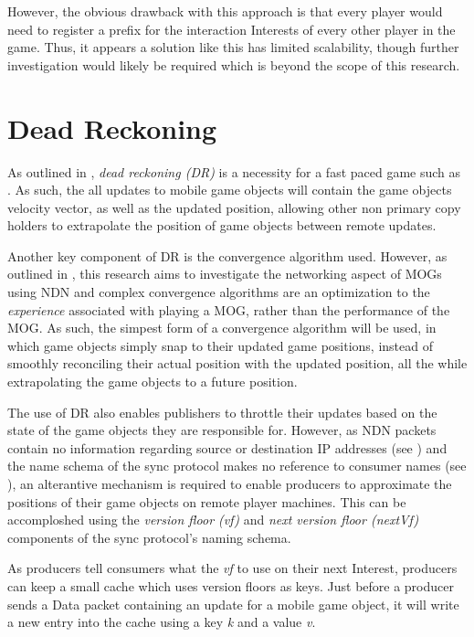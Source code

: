 However, the obvious drawback with this approach is that every player would need to register a prefix for the interaction Interests of every other player in the game. Thus, it appears a solution like this has limited scalability, though further investigation would likely be required which is beyond the scope of this research. 



\section{Dead Reckoning}\label{sec:des:dr}
As outlined in , \textit{dead reckoning (DR)} is a necessity for a fast paced game such as \game{}. As such, the all updates to mobile game objects will contain the game objects velocity vector, as well as the updated position, allowing other non primary copy holders to extrapolate the position of game objects between remote updates.

Another key component of DR is the convergence algorithm used. However, as outlined in , this research aims to investigate the networking aspect of MOGs using NDN and complex convergence algorithms are an optimization to the \textit{experience} associated with playing a MOG, rather than the performance of the MOG. As such, the simpest form of a convergence algorithm will be used, in which game objects simply snap to their updated game positions, instead of smoothly reconciling their actual position with the updated position, all the while extrapolating the game objects to a future position.

The use of DR also enables publishers to throttle their updates based on the state of the game objects they are responsible for. However, as NDN packets contain no information regarding source or destination IP addresses (see ) and the name schema of the sync protocol makes no reference to consumer names (see ), an alterantive mechanism is required to enable producers to approximate the positions of their game objects on remote player machines. This can be accomploshed using the \textit{version floor (vf)} and \textit{next version floor (nextVf)} components of the sync protocol's naming schema.

As producers tell consumers what the \textit{vf} to use on their next Interest, producers can keep a small cache which uses version floors as keys. Just before a producer sends a Data packet containing an update for a mobile game object, it will write a new entry into the cache using a key \textit{k} and a value \textit{v}. 

